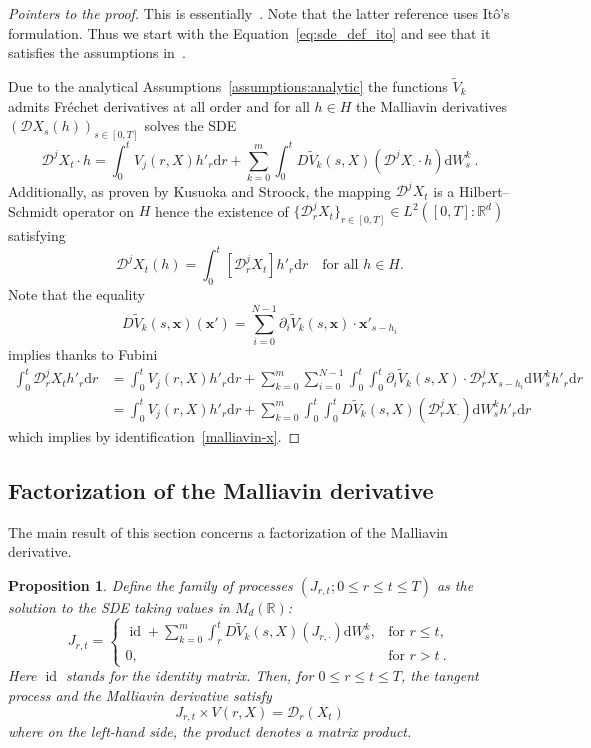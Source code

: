 \documentclass[11pt]{article}
\newtheorem{prop}[theo]{Proposition}
\theoremstyle{definition}
\numberwithin{equation}{section}
\numberwithin{figure}{section}
\numberwithin{table}{section}
\DeclareMathOperator{\id}{id}
\newcommand*\pa{\partial}
\newcommand*\R{\mathbb{R}}
\newcommand*\Dc{\mathcal{D}}
\newcommand*\xb{\mathbf{x}}
\newcommand*{\dd}{\mathrm{d}}
\newcommand*{\dW}{\dd W}
\newcommand*{\dr}{\dd r}
\begin{document}
\begin{proof}[Pointers to the proof]
This is essentially~\cite[Lemma~2.9]{KS1984}. Note that the latter reference uses Itô's formulation. Thus we start with the Equation~\eqref{eq:sde_def_ito} and see that it satisfies the assumptions in~\cite[Lemma~2.9]{KS1984}.

Due to the analytical Assumptions~\ref{assumptions:analytic} the functions $\widetilde{V}_k$ admits Fréchet derivatives at all order and for all $h\in H$ the Malliavin derivatives $(\Dc X_s(h))_{s\in [0,T]}$ solves the SDE
\begin{equation}
\Dc^j X_t \cdot h = \int_0^t {V}_j(r,X)h'_r \dr+\sum_{k=0}^m \int_0^t D\widetilde{V}_k(s,X)(\Dc^j X_\cdot \cdot h) \dW_s^k \ .
\end{equation}
Additionally, as proven by Kusuoka and Stroock, the mapping $\Dc^j X_t$ is a Hilbert--Schmidt operator on $H$ hence the existence of $\{\Dc_r^j X_t\}_{r\in[0,T]}\in L^2([0,T]:\R^d)$ satisfying
\[
\Dc^j X_t(h)=\int_0^t \left[\Dc_r^j X_t \right] h'_r \dr \quad\text{for all }h\in H.
\]
Note that the equality
\[
D\widetilde{V}_k(s,\xb)(\xb') = \sum_{i=0}^{N-1} \pa_i \widetilde V_k (s,\xb) \cdot \xb'_{s-h_i}
\]
implies thanks to Fubini
\begin{align*}
\int_0^t \Dc^j_r X_t h'_r \dr&=\int_0^t {V}_j(r,X)h'_r \dr+\sum_{k=0}^m\sum_{i=0}^{N-1} \int_0^t\int_0^t \pa_i\widetilde{V}_k(s,X) \cdot \Dc^j_r X_{s-h_i} \dW_s^k h'_r\dr\\
&=\int_0^t {V}_j(r,X)h'_r \dr + \sum_{k=0}^m \int_0^t\int_0^t D\widetilde{V}_k(s,X) (\Dc^j_r X_\cdot) \dW_s^k h'_r\dr
\end{align*}
which implies by identification~\eqref{malliavin-x}.
\end{proof}

\subsection{Factorization of the Malliavin derivative}

The main result of this section concerns a factorization of the Malliavin derivative.

\begin{prop}\label{proposition:malliavin_derivative_expr}
Define the family of processes $\left(J_{r,t} ; 0 \leq r \leq t \leq T \right)$ as the solution to the SDE taking values in $M_d(\R)$:
\begin{equation}\label{eq:flow1}
J_{r,t} =
\begin{cases}
\id + \sum_{k=0}^m \int_{r}^t D\widetilde{V}_k (s,X)\left(J_{r, \cdot} \right) \dW_s^k,& \text{for } r \leq t, \\
0, &\text{for } r > t \ .
\end{cases}
\end{equation}
Here $\id$ stands for the identity matrix. Then, for $0\leq r \leq t\leq T$, the tangent process and the Malliavin derivative satisfy
\begin{equation}\label{equation-tangent-malliavin}
J_{r, t} \times V\left(r,X \right) = \Dc_r \left(X_t \right)
\end{equation}
where on the left-hand side, the product denotes a matrix product.
\end{prop}
\end{document}
